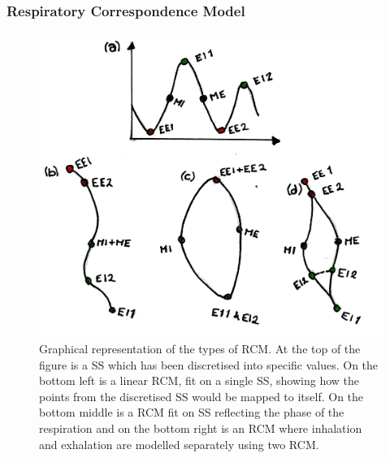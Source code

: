             \subsubsection{Respiratory Correspondence Model} \label{sec:respiratory_correspondence_model}
                \begin{figure}
                    \centering
                            
                    \includegraphics[width=1.0\linewidth]{figures/background_rcm.png}
                            
                    \captionsetup{singlelinecheck=false, justification=raggedright}
                    \caption{Graphical representation of the types of \gls{RCM}. At the top of the figure is a \gls{SS} which has been discretised into specific values. On the bottom left is a linear \gls{RCM}, fit on a single \gls{SS}, showing how the points from the discretised \gls{SS} would be mapped to itself. On the bottom middle is a \gls{RCM} fit on \gls{SS} reflecting the phase of the respiration and on the bottom right is an \gls{RCM} where inhalation and exhalation are modelled separately using two \gls{RCM}.} \label{fig:motion_modelling_rcm}
                \end{figure}
                

